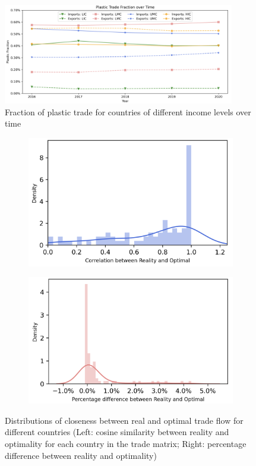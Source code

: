 \documentclass[dvipsnames]{article}
\begin{document}
\begin{figure}[htb!] 
	\centering
		\includegraphics[width=0.9\textwidth]{figures/time_series.png}
	\caption{\small Fraction of plastic trade for countries of different income levels over time}
	\label{fig:timeseries}
\end{figure}

\begin{figure}[htb!]
	\centering
	\begin{subfigure}{0.46\textwidth}
		\centering
		\includegraphics[width=\textwidth]{corr_diff.png}	
	\end{subfigure}
	\begin{subfigure}{0.46\textwidth}
		\centering 
		\includegraphics[width=\textwidth]{relative_diff.png}
	\end{subfigure}
	\caption{\small Distributions of closeness between real and optimal trade flow for different countries (Left: cosine similarity between reality and optimality for each country in the trade matrix; Right: percentage difference between reality and optimality)}
	\label{fig:corr_dist}
\end{figure}
\end{document}
